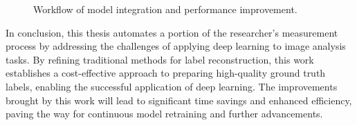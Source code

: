 \begin{figure}[H]
    \centering
    \caption{Workflow of model integration and performance improvement.}
    \label{fig:workflow-diagram}
\end{figure}






In conclusion, this thesis automates a portion of the researcher’s measurement process by addressing the challenges of applying deep learning to image analysis tasks. By refining traditional methods for label reconstruction, this work establishes a cost-effective approach to preparing high-quality ground truth labels, enabling the successful application of deep learning. The improvements brought by this work will lead to significant time savings and enhanced efficiency, paving the way for continuous model retraining and further advancements.

